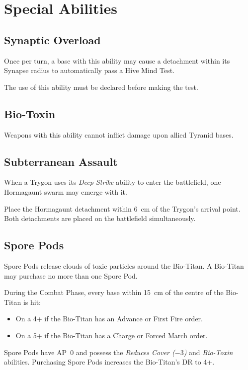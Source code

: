 \section{Special Abilities}

\subsection{Synaptic Overload}

Once per turn, a base with this ability may cause a detachment within its Synapse radius to automatically pass a Hive Mind Test.

The use of this ability must be declared before making the test.

\subsection{Bio-Toxin}

Weapons with this ability cannot inflict damage upon allied Tyranid bases.

\subsection{Subterranean Assault}

When a Trygon uses its \textit{Deep Strike} ability to enter the battlefield, one Hormagaunt swarm may emerge with it.

Place the Hormagaunt detachment within 6~cm of the Trygon's arrival point. Both detachments are placed on the battlefield simultaneously.

\subsection{Spore Pods}

Spore Pods release clouds of toxic particles around the Bio-Titan. A Bio-Titan may purchase no more than one Spore Pod.

During the Combat Phase, every base within 15~cm of the centre of the Bio-Titan is hit:

\begin{itemize}
    \item On a 4+ if the Bio-Titan has an Advance or First Fire order.
    \item On a 5+ if the Bio-Titan has a Charge or Forced March order.
\end{itemize}

Spore Pods have AP~0 and possess the \textit{Reduces Cover ($-3$)} and \textit{Bio-Toxin} abilities. Purchasing Spore Pods increases the Bio-Titan's DR to 4+.

